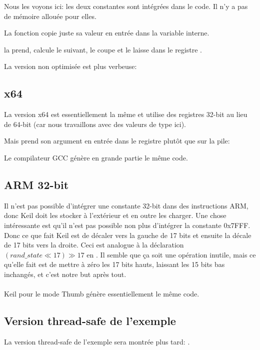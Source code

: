 Nous les voyons ici: les deux constantes sont intégrées dans le code.
Il n'y a pas de mémoire allouée pour elles.

La fonction  copie juste sa valeur en entrée dans la variable 
interne.

 la prend, calcule le  suivant, le coupe et le laisse
dans le registre \EAX.

La version non optimisée est plus verbeuse:



\subsection{x64}

La version x64 est essentiellement la même et utilise des registres 32-bit au lieu
de 64-bit (car nous travaillons avec des valeurs de type \Tint ici).

Mais  prend son argument en entrée dans le registre \ECX plutôt que
sur la pile:



Le compilateur GCC génère en grande partie le même code.

\subsection{ARM 32-bit}



Il n'est pas possible d'intégrer une constante 32-bit dans des instructions ARM,
donc Keil doit les stocker à l'extérieur et en outre les charger.
Une chose intéressante est qu'il n'est pas possible non plus d'intégrer la constante
0x7FFF.
Donc ce que fait Keil est de décaler  vers la gauche de 17 bits et
ensuite la décale de 17 bits vers la droite.
Ceci est analogue à la déclaration $(rand\_state \ll 17) \gg 17$ en \CCpp.
Il semble que ça soit une opération inutile, mais ce qu'elle fait est de mettre à
zéro les 17 bits hauts, laissant les 15 bits bas inchangés, et c'est notre but après
tout.\\
\\
Keil \Optimizing pour le mode Thumb génère essentiellement le même code.



\subsection{Version thread-safe de l'exemple}

La version thread-safe de l'exemple sera montrée plus tard: .
